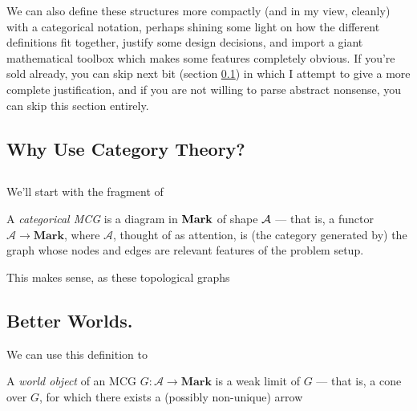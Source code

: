 \documentclass{article}
\begin{document}
	We can also define these structures more compactly (and in my view, cleanly) with a categorical notation, perhaps shining some light on how the different definitions fit together, justify some design decisions, and import a giant mathematical toolbox which makes some features completely obvious. If you're sold already, you can skip next bit (section \ref{sec:cat-defense}) in which I attempt to give a more complete justification, and if you are not willing to parse abstract nonsense, you can skip this section entirely.
	
	\subsection{Why Use Category Theory?}\label{sec:cat-defense}
	

	\subsection{}
	We'll start with the fragment of 
	
	\begin{defn}
		A \emph{categorical MCG} is a diagram in $\bf Mark$ of shape $\cal A$ --- that is, a functor $\mathcal A \to \mathbf{Mark}$, where $\mathcal A$, thought of as attention, is (the category generated by) the graph whose nodes and edges are relevant features of the problem setup.
	\end{defn}
	
	This makes sense, as these topological graphs
	\subsection{Better Worlds.} \label{cat-worlds}
	

	
	We can use this definition to 
	
	\begin{defn}
		A \emph{world object} of an MCG $G : \mathcal A \to \mathbf{Mark}$ is a weak limit of $G$ --- that is, a cone over $G$, for which there exists a (possibly non-unique) arrow 
	\end{defn}
\end{document}
